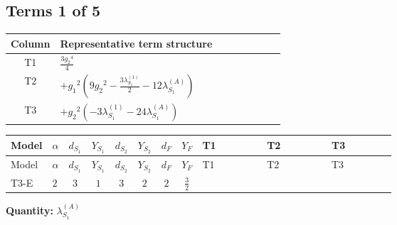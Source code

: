 \documentclass[8pt]{article}
\begin{document}
\begin{landscape}
\subsection*{Terms 1 of 5}
\begin{center}
\begin{tabular}{@{}c >{\raggedright\arraybackslash}p{0.82\linewidth}@{}}
\toprule
Column & Representative term structure \\
\midrule
T1 & \(\displaystyle \frac{3 {g_2}^4}{4}\) \\
\midrule
T2 & \(\displaystyle +{g_1}^2 \left(9 {g_2}^2-\frac{3 {\lambda_{S_1}^{(1)}}}{2}-12 {\lambda_{S_1}^{(A)}}\right)\) \\
\midrule
T3 & \(\displaystyle +{g_2}^2 (-3 {\lambda_{S_1}^{(1)}}-24 {\lambda_{S_1}^{(A)}})\) \\
\midrule
\bottomrule
\end{tabular}
\end{center}
\smallskip
\tiny
\begin{longtable}{@{}llcccccc >{\raggedright\arraybackslash}p{0.21\linewidth} >{\raggedright\arraybackslash}p{0.21\linewidth} >{\raggedright\arraybackslash}p{0.21\linewidth}@{}}
\toprule
Model & $\alpha$ & $d_{S_1}$ & $Y_{S_1}$ & $d_{S_2}$ & $Y_{S_2}$ & $d_F$ & $Y_F$ & T1 & T2 & T3 \\
\midrule
\endfirsthead
\toprule
Model & $\alpha$ & $d_{S_1}$ & $Y_{S_1}$ & $d_{S_2}$ & $Y_{S_2}$ & $d_F$ & $Y_F$ & T1 & T2 & T3 \\
\midrule
\endhead
T3-E & $2$ & $3$ & $1$ & $3$ & $2$ & $2$ & $\frac{3}{2}$ & \scriptsize\adjustbox{max width=\linewidth}{$\begin{gathered} \frac{3 {g_2}^4}{4}\end{gathered}$} & \scriptsize\adjustbox{max width=\linewidth}{$\begin{gathered} +{g_1}^2 \left(9 {g_2}^2-\frac{3 {\lambda_{S_1}^{(1)}}}{2}-12 {\lambda_{S_1}^{(A)}}\right)\end{gathered}$} & \scriptsize\adjustbox{max width=\linewidth}{$\begin{gathered} +{g_2}^2 (-3 {\lambda_{S_1}^{(1)}}-24 {\lambda_{S_1}^{(A)}})\end{gathered}$} \\
\midrule
\bottomrule
\end{longtable}
\clearpage
\noindent\textbf{Quantity: }$\lambda_{S_1}^{(A)}$\par\smallskip

\end{landscape}
\end{document}
